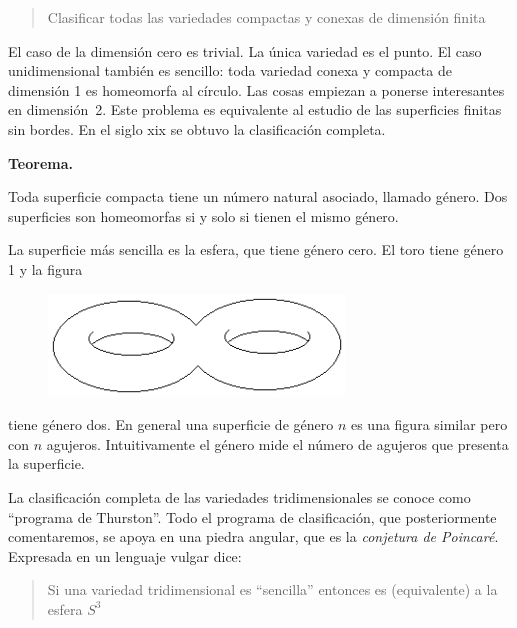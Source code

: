 \documentclass[a4paper, 12pt]{article}
\begin{document}
\begin{quote} \it

Clasificar todas las variedades compactas y conexas de dimensión finita

\end{quote}

El caso de la dimensión cero es trivial.  La única variedad es el punto.  El caso unidimensional también es sencillo: toda variedad conexa y compacta de dimensión 1 es homeomorfa al círculo.  Las cosas empiezan a ponerse interesantes en dimensión~2.  Este problema es equivalente al  estudio de las superficies finitas sin bordes.  En el siglo {\sc xix} se obtuvo la clasificación completa.

\smallskip

{\bf Teorema.} \begin{it}
Toda superficie compacta tiene un número natural asociado, llamado {\sf género}.  Dos superficies son homeomorfas si y solo si tienen el mismo género.
\end{it}

\smallskip

La superficie más sencilla es la esfera, que tiene género cero.  El toro tiene género 1 y la figura

\begin{figure}[htbp]
	\centering
		\includegraphics[width=0.70\textwidth]{imagenes/genero2.jpg}

	\label{fig:genero2}
\end{figure}


\noindent tiene género dos. En general una superficie de género $n$ es una figura similar pero con $n$ agujeros.  Intuitivamente el género mide el número de agujeros que presenta la superficie.  

\smallskip

La clasificación completa de las variedades tridimensionales se conoce como ``programa de Thurston''.  Todo el programa de clasificación, que posteriormente comentaremos,  se apoya en una piedra angular, que es la {\it conjetura de Poincaré}.  Expresada en un lenguaje vulgar dice:

\begin{quote} \it 

Si una variedad tridimensional es ``sencilla'' entonces es (equivalente) a la  esfera $S^3$

\end{quote}
\end{document}
